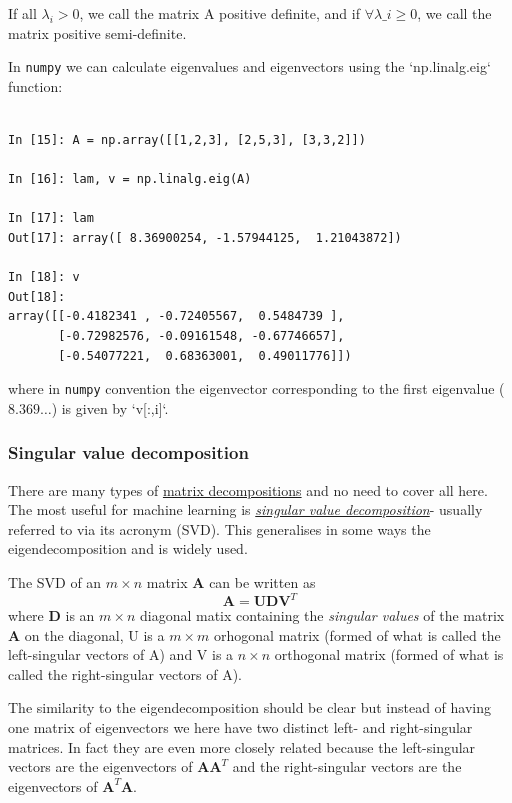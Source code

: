 \documentclass[a4paper,10pt]{article}
\newcommand{\link}[2]{{\color{blue}\href{#1}{#2}}}
\begin{document}
If all $\lambda_i >0$, we call the matrix $\mathrm{A}$ positive definite, and if $\forall \lambda\_i \ge 0$, we call the matrix positive semi-definite. 


In \texttt{numpy} we can calculate eigenvalues and eigenvectors using the `np.linalg.eig` function:
\begin{lstlisting}

In [15]: A = np.array([[1,2,3], [2,5,3], [3,3,2]])

In [16]: lam, v = np.linalg.eig(A)

In [17]: lam
Out[17]: array([ 8.36900254, -1.57944125,  1.21043872])

In [18]: v
Out[18]: 
array([[-0.4182341 , -0.72405567,  0.5484739 ],
       [-0.72982576, -0.09161548, -0.67746657],
       [-0.54077221,  0.68363001,  0.49011776]])
\end{lstlisting}


where in \texttt{numpy} convention the eigenvector corresponding to the first eigenvalue ($8.369\ldots$) is given by `v[:,i]`.


\subsubsection{ Singular value decomposition}


There are many types of \link{https://en.wikipedia.org/wiki/Matrix_decomposition}{matrix decompositions} and no need to cover all here. The most useful for machine learning is \link{https://en.wikipedia.org/wiki/Singular_value_decomposition}{\textit{singular value decomposition}}- usually referred to via its acronym (SVD). This generalises in some ways the eigendecomposition and is widely used.

The SVD of an $m \times n$ matrix $\mathbf{A}$ can be written as $$\mathbf{A} = \mathbf{U}\mathbf{D}\mathbf{V}^T$$ where $\mathbf{D}$ is an $m\times n$ diagonal matix containing the \textit{singular values} of the matrix $\mathbf{A}$ on the diagonal, $\mathrm{U}$ is a $m\times m$ orhogonal matrix (formed of what is called the left-singular vectors of $\mathrm{A}$)  and $\mathrm{V}$ is a $n\times n$ orthogonal matrix (formed of what is called the right-singular vectors of $\mathrm{A}$).

The similarity to the eigendecomposition should be clear but instead of having one matrix of eigenvectors we here have two distinct left- and right-singular matrices. In fact they are even more closely related because the left-singular vectors are the eigenvectors of $\mathbf{A}\mathbf{A}^T$ and the right-singular vectors are the eigenvectors of $\mathbf{A}^T\mathbf{A}$.
\end{document}
